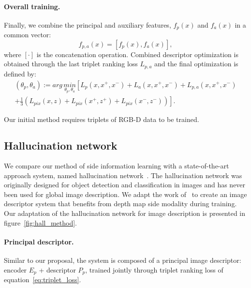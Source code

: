 \paragraph{Overall training.}
Finally, we combine the principal and auxiliary features, $f_p(x)$ and $f_a(x)$ in a common vector:
\begin{equation}
	\label{eq:concat_desc}
	f_{p,a}(x) = \left[ f_p(x), f_a(x)  \right],
\end{equation}
where $[ \cdot ]$ is the concatenation operation. Combined descriptor optimization is obtained through the last triplet ranking loss $L_{p,a}$ and the final optimization is defined by:
\begin{multline}
	\label{eq:overall_loss}
	\left( \theta_{p}, \theta_{a} \right) := arg\,\underset{\theta_p, \theta_a}{min} \left[ L_p(x, x^+, x^-) + L_a(x, x^+, x^-) + L_{p,a}(x, x^+, x^-) \right. \\
	\left. + \frac{1}{3}\left( L_{pix}(x, z) + L_{pix}(x^+, z^+) + L_{pix}(x^-, z^-) \right) \right].
\end{multline}

\noindent Our initial method requires triplets of RGB-D data to be trained.

\subsection{Hallucination network}


We compare our method of side information learning with a state-of-the-art approach system, named hallucination network~\citep{Hoffman2016}. The hallucination network was originally designed for object detection and classification in images and has never been used for global image description. We adapt the work of~\citet{Hoffman2016} to create an image descriptor system that benefits from depth map side modality during training. Our adaptation of the hallucination network for image description is presented in figure~\ref{fig:hall_method}.

\paragraph{Principal descriptor.}
Similar to our proposal, the system is composed of a principal image descriptor: encoder $E_p$ + descriptor $P_p$, trained jointly through triplet ranking loss of equation~\ref{eq:triplet_loss}.


